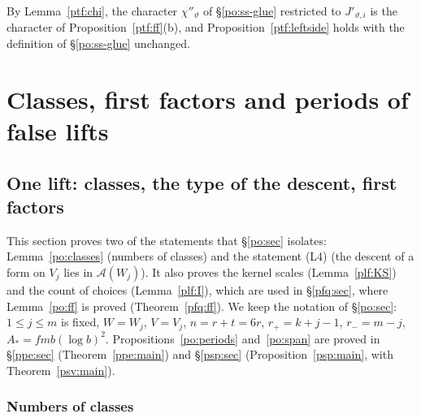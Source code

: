 \documentclass[10pt]{amsart}
\theoremstyle{definition}
\theoremstyle{remark}
\providecommand{\psHS}{\mathcal H}
\providecommand{\psvac}{\mathbf v}
\begin{document}
By Lemma~\ref{ptf:chi}, the character $\chi''_\vartheta$ of \S\ref{po:ss-glue} restricted
to $J'_{\vartheta,i}$ is the character of Proposition~\ref{ptf:ff}(b), and Proposition~\ref{ptf:leftside} holds with the
definition of \S\ref{po:ss-glue} unchanged.



\section{Classes, first factors and periods of false lifts}\label{C2:g3}
\providecommand{\auO}{\mathcal O}
\providecommand{\auU}{\mathrm U}
\providecommand{\auGL}{\mathrm{GL}}
\providecommand{\auHom}{\operatorname{Hom}}
\providecommand{\auA}{\mathbb A}
\providecommand{\auF}{\mathbb F}
\providecommand{\auPl}{\Phi}
\providecommand{\auNm}{\operatorname{Nm}}
\providecommand{\auAut}{\operatorname{Aut}}
\providecommand{\aubar}[1]{\overline{#1}}
\providecommand{\pao}{\mathfrak o}
\providecommand{\psvac}{\mathbf v}
\providecommand{\plone}{\mathbf 1}
\providecommand{\plgb}[2]{\|#2\|_{#1}}
\providecommand{\psHS}{\mathcal H}
\providecommand{\psrho}{\varrho}
\providecommand{\pzF}{\mathfrak F}
\providecommand{\poA}{\mathcal A}
\providecommand{\poAA}{A_\ast}
\providecommand{\pop}{\mathsf p}
\providecommand{\pog}{\mathsf g}
\providecommand{\plfK}{\mathsf K}
\providecommand{\pkm}{\mathsf m}

\subsection{One lift: classes, the type of the descent, first factors}\label{plf:sec}

This section proves two of the statements that \S\ref{po:sec} isolates: Lemma~\ref{po:classes}
(numbers of classes) and the statement (L4) (the descent of a form on $V_j$ lies in $\poA(W_j)$). It
also proves the kernel scales (Lemma~\ref{plf:KS}) and the count of choices (Lemma~\ref{plf:I}), which are
used in \S\ref{pfq:sec}, where
Lemma~\ref{po:ff} is proved (Theorem~\ref{pfq:ff}). We keep the notation of \S\ref{po:sec}: $1\le j\le m$
is fixed, $W=W_j$, $V=V_j$, $n=r+t=6r$, $r_+=k+j-1$, $r_-=m-j$, $\poAA=fmb(\log b)^2$.
Propositions~\ref{po:periods} and~\ref{po:span} are proved in \S\ref{ppe:sec} (Theorem~\ref{ppe:main}) and
\S\ref{psp:sec} (Proposition~\ref{psp:main}, with Theorem~\ref{psv:main}).

\subsubsection{Numbers of classes}\label{plf:ss-classes}
\end{document}
